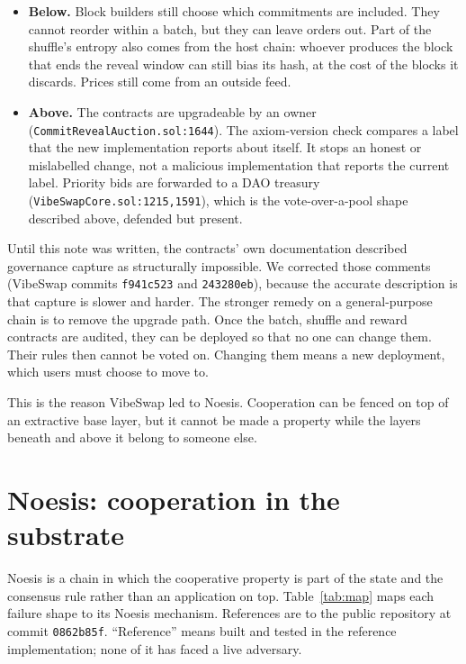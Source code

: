 \documentclass[11pt]{article}
\begin{document}
\begin{itemize}
\item \textbf{Below.} Block builders still choose which commitments are included. They cannot reorder within a batch, but they can leave orders out. Part of the shuffle's entropy also comes from the host chain: whoever produces the block that ends the reveal window can still bias its hash, at the cost of the blocks it discards. Prices still come from an outside feed.
\item \textbf{Above.} The contracts are upgradeable by an owner (\texttt{CommitRevealAuction.sol:1644}). The axiom-version check compares a label that the new implementation reports about itself. It stops an honest or mislabelled change, not a malicious implementation that reports the current label. Priority bids are forwarded to a DAO treasury (\texttt{VibeSwapCore.sol:1215,1591}), which is the vote-over-a-pool shape described above, defended but present.
\end{itemize}

\noindent Until this note was written, the contracts' own documentation described governance capture as structurally impossible. We corrected those comments (VibeSwap commits \texttt{f941c523} and \texttt{243280eb}), because the accurate description is that capture is slower and harder. The stronger remedy on a general-purpose chain is to remove the upgrade path. Once the batch, shuffle and reward contracts are audited, they can be deployed so that no one can change them. Their rules then cannot be voted on. Changing them means a new deployment, which users must choose to move to.

This is the reason VibeSwap led to Noesis. Cooperation can be fenced on top of an extractive base layer, but it cannot be made a property while the layers beneath and above it belong to someone else.

\section{Noesis: cooperation in the substrate}

Noesis is a chain in which the cooperative property is part of the state and the consensus rule rather than an application on top. Table~\ref{tab:map} maps each failure shape to its Noesis mechanism. References are to the public repository at commit \texttt{0862b85f}. ``Reference'' means built and tested in the reference implementation; none of it has faced a live adversary.
\end{document}
